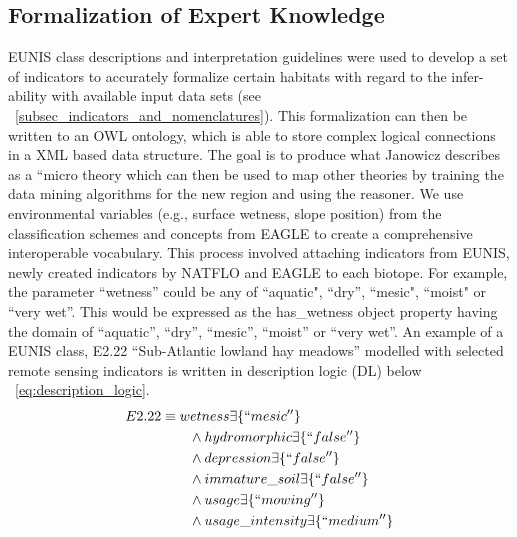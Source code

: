 \documentclass[authoryear, review,12pt,number]{elsarticle}
\begin{document}
\subsection{Formalization of Expert Knowledge}
EUNIS class descriptions and interpretation guidelines \citep{EUNISManual} were
used to develop a set of indicators to accurately formalize certain habitats
with regard to the infer-ability with available input data sets (see
~\ref{subsec_indicators_and_nomenclatures}). This formalization can then be
written to an OWL ontology, which is able to store complex logical connections
in a XML based data structure. The goal is to produce what Janowicz describes
as a ``micro theory \citep{Janowicz2012} which can then be used to map other
theories by training the data mining algorithms for the new
region and using the reasoner. We use environmental variables (e.g., surface
wetness, slope position) from the classification schemes and concepts from
EAGLE to create a comprehensive interoperable vocabulary. This process involved
attaching indicators from EUNIS, newly created indicators by NATFLO and EAGLE
to each biotope. For example, the parameter ``wetness'' could be any of
``aquatic", ``dry'', ``mesic", ``moist" or ``very wet''. This would be expressed
as the has\_wetness object property having the domain of ``aquatic'', ``dry'',
``mesic'', ``moist'' or ``very wet''. An example of a EUNIS class, E2.22
``Sub-Atlantic lowland hay meadows'' modelled with selected remote sensing
indicators is written in description logic (DL) below
~\ref{eq:description_logic}.
\begin{equation}
\begin{align*}
E2.22 &\equiv wetness \exists \{``mesic''\} \\
&\qquad {} \land hydromorphic \exists \{``false''\} \\
&\qquad {} \land depression \exists \{``false''\} \\
&\qquad {} \land immature\_soil \exists \{``false''\} \\
&\qquad {} \land usage \exists \{``mowing''\} \\
&\qquad {} \land usage\_intensity \exists \{``medium''\} \\
\end{align*}
\label{eq:description_logic}
\end{equation}
\end{document}
